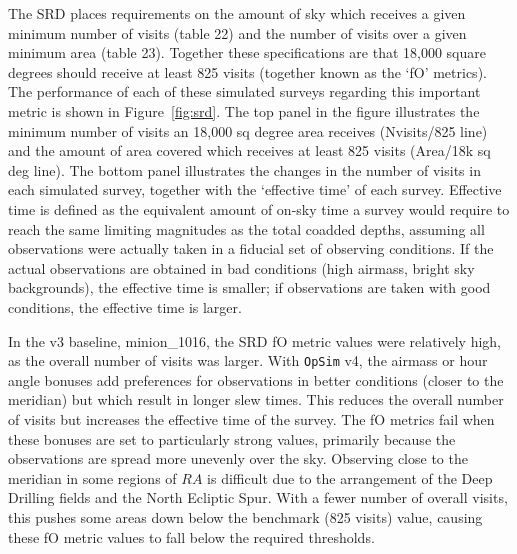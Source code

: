 \documentclass[DM,lsstdraft,authoryear,toc]{lsstdoc}
\newcommand{\opsim}{\texttt{OpSim}\xspace}
\begin{document}
The SRD places requirements on the amount of sky which receives a given minimum number of visits (table 22) and the number of visits over a given minimum area (table 23). Together these specifications are that 18,000 square degrees should receive at least 825 visits (together known as the `fO' metrics). The performance of each of these simulated surveys regarding this important metric is shown in Figure~\ref{fig:srd}. The top panel in the figure illustrates the minimum number of visits an 18,000 sq degree area receives (Nvisits/825 line) and the amount of area covered which receives at least 825 visits (Area/18k sq deg line).  The bottom panel illustrates the changes in the number of visits in each simulated survey, together with the `effective time' of each survey. Effective time is defined as the equivalent amount of on-sky time a survey would require to reach the same limiting magnitudes as the total coadded depths, assuming all observations were actually taken in a fiducial set of observing conditions. If the actual observations are obtained in bad conditions (high airmass, bright sky backgrounds), the effective time is smaller; if observations are taken with good conditions, the effective time is larger.

In the v3 baseline, minion\_1016, the SRD fO metric values were relatively high, as the overall number of visits was larger. With \opsim v4, the airmass or hour angle bonuses add preferences for observations in better conditions (closer to the meridian) but which result in longer slew times. This reduces the overall number of visits but increases the effective time of the survey. The fO metrics fail when these bonuses are set to particularly strong values, primarily because the observations are spread more unevenly over the sky. Observing close to the meridian in some regions of $RA$ is difficult due to the arrangement of the Deep Drilling fields and the North Ecliptic Spur. With a fewer number of overall visits, this pushes some areas down below the benchmark (825 visits) value, causing these fO metric values to fall below the required thresholds. 
\end{document}
